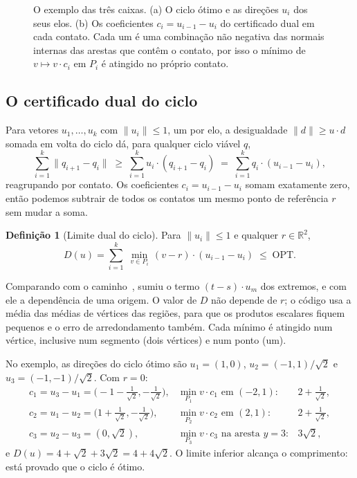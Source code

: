 \documentclass[11pt,a4paper]{article}
\theoremstyle{plain}\newtheorem{proposicao}{Proposição}
\theoremstyle{definition}\newtheorem{definicao}{Definição}
\theoremstyle{plain}\newtheorem{teorema}{Teorema}
\theoremstyle{plain}\newtheorem{lema}{Lema}
\newcommand{\R}{\mathbb R}
\newcommand{\norm}[1]{\lVert#1\rVert}
\newcommand{\OPT}{\mathrm{OPT}}
\begin{document}
\begin{figure}[ht]\centering\figtrescaixas
\caption{O exemplo das três caixas. (a) O ciclo ótimo e as direções \(u_i\) dos seus elos. (b) Os coeficientes \(c_i=u_{i-1}-u_i\) do certificado dual em cada contato. Cada um é uma combinação não negativa das normais internas das arestas que contêm o contato, por isso o mínimo de \(v\mapsto v\cdot c_i\) em \(P_i\) é atingido no próprio contato.}\label{fig:trescaixas}
\end{figure}

\subsection{O certificado dual do ciclo}\label{sec:dualciclo}
Para vetores \(u_1,\dots,u_k\) com \(\norm{u_i}\le1\), um por elo, a desigualdade \(\norm d\ge u\cdot d\) somada em volta do ciclo dá, para qualquer ciclo viável \(q\),
\[
\sum_{i=1}^k\norm{q_{i+1}-q_i}\;\ge\;\sum_{i=1}^k u_i\cdot(q_{i+1}-q_i)\;=\;\sum_{i=1}^k q_i\cdot(u_{i-1}-u_i),
\]
reagrupando por contato. Os coeficientes \(c_i=u_{i-1}-u_i\) somam exatamente zero, então podemos subtrair de todos os contatos um mesmo ponto de referência \(r\) sem mudar a soma.

\begin{definicao}[Limite dual do ciclo]\label{def:dualciclo}
Para \(\norm{u_i}\le1\) e qualquer \(r\in\R^2\),
\begin{equation}\label{eq:dualciclo}
D(u)=\sum_{i=1}^k\;\min_{v\in P_i}\,(v-r)\cdot(u_{i-1}-u_i)\;\le\;\OPT .
\end{equation}
\end{definicao}

Comparando com o caminho~\cite{oraculo}, sumiu o termo \((t-s)\cdot u_m\) dos extremos, e com ele a dependência de uma origem. O valor de \(D\) não depende de \(r\); o código usa a média das médias de vértices das regiões, para que os produtos escalares fiquem pequenos e o erro de arredondamento também. Cada mínimo é atingido num vértice, inclusive num segmento (dois vértices) e num ponto (um).

No exemplo, as direções do ciclo ótimo são \(u_1=(1,0)\), \(u_2=(-1,1)/\sqrt2\) e \(u_3=(-1,-1)/\sqrt2\). Com \(r=0\):
\[
\begin{array}{lll}
c_1=u_3-u_1=\bigl(-1-\tfrac1{\sqrt2},-\tfrac1{\sqrt2}\bigr), & \min_{P_1} v\cdot c_1 \text{ em } (-2,1): & 2+\tfrac1{\sqrt2},\\[3pt]
c_2=u_1-u_2=\bigl(1+\tfrac1{\sqrt2},-\tfrac1{\sqrt2}\bigr), & \min_{P_2} v\cdot c_2 \text{ em } (2,1): & 2+\tfrac1{\sqrt2},\\[3pt]
c_3=u_2-u_3=(0,\sqrt2), & \min_{P_3} v\cdot c_3 \text{ na aresta } y=3: & 3\sqrt2,
\end{array}
\]
e \(D(u)=4+\sqrt2+3\sqrt2=4+4\sqrt2\). O limite inferior alcança o comprimento: está provado que o ciclo é ótimo.
\end{document}
